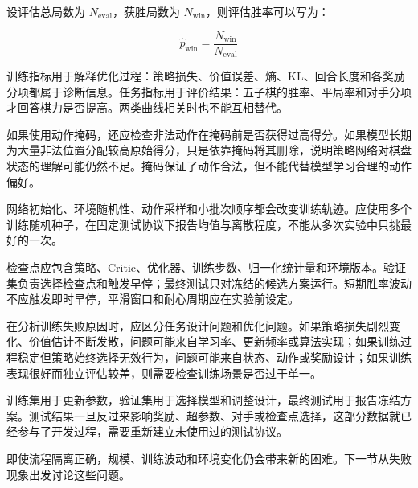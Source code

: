 设评估总局数为 $N_{\mathrm{eval}}$，获胜局数为 $N_{\mathrm{win}}$，则评估胜率可以写为：

\begin{equation}
\widehat{p}_{\mathrm{win}}
=
\frac{
N_{\mathrm{win}}
}{
N_{\mathrm{eval}}
}
\end{equation}

训练指标用于解释优化过程：策略损失、价值误差、熵、KL、回合长度和各奖励分项都属于诊断信息。任务指标用于评价结果：五子棋的胜率、平局率和对手分项才回答棋力是否提高。两类曲线相关时也不能互相替代。

如果使用动作掩码，还应检查非法动作在掩码前是否获得过高得分。如果模型长期为大量非法位置分配较高原始得分，只是依靠掩码将其删除，说明策略网络对棋盘状态的理解可能仍然不足。掩码保证了动作合法，但不能代替模型学习合理的动作偏好。

网络初始化、环境随机性、动作采样和小批次顺序都会改变训练轨迹。应使用多个训练随机种子，在固定测试协议下报告均值与离散程度，不能从多次实验中只挑最好的一次。

检查点应包含策略、Critic、优化器、训练步数、归一化统计量和环境版本。验证集负责选择检查点和触发早停；最终测试只对冻结的候选方案运行。短期胜率波动不应触发即时早停，平滑窗口和耐心周期应在实验前设定。

在分析训练失败原因时，应区分任务设计问题和优化问题。如果策略损失剧烈变化、价值估计不断发散，问题可能来自学习率、更新频率或算法实现；如果训练过程稳定但策略始终选择无效行为，问题可能来自状态、动作或奖励设计；如果训练表现很好而独立评估较差，则需要检查训练场景是否过于单一。

训练集用于更新参数，验证集用于选择模型和调整设计，最终测试用于报告冻结方案。测试结果一旦反过来影响奖励、超参数、对手或检查点选择，这部分数据就已经参与了开发过程，需要重新建立未使用过的测试协议。

即使流程隔离正确，规模、训练波动和环境变化仍会带来新的困难。下一节从失败现象出发讨论这些问题。



